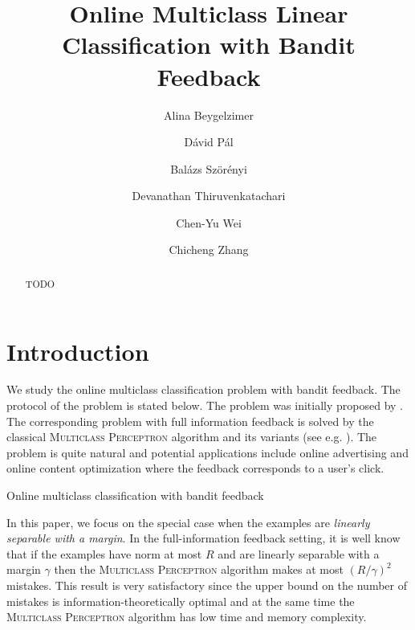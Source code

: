 \documentclass[12pt]{article}
\title{Online Multiclass Linear Classification with Bandit Feedback}
\author{
Alina Beygelzimer \and
D\'avid P\'al \and
Bal\'azs Sz\"or\'enyi \and
Devanathan Thiruvenkatachari \and
Chen-Yu Wei \and
Chicheng Zhang
}
\begin{document}
\maketitle

\begin{abstract}
TODO
\end{abstract}

\section{Introduction}
\label{section:introduction}

We study the online multiclass classification problem with bandit feedback. The
protocol of the problem is stated below. The problem was initially proposed by
\cite{Kakade-Shalev-Shwartz-Tewari-2008}. The corresponding problem with full
information feedback is solved by the classical \textsc{Multiclass Perceptron}
algorithm and its variants (see e.g.
\cite{Crammer-Dekel-Keshet-Shalev-Shwartz-Singer-2006}). The problem is quite
natural and potential applications include online advertising and online content
optimization where the feedback corresponds to a user's click.

\begin{algorithm}[h]
\caption{Online multiclass classification with bandit feedback
\label{algorithm:game-protocol}}
\begin{algorithmic}[1]
{
\ENDFOR
}
\end{algorithmic}
\end{algorithm}

In this paper, we focus on the special case when the examples are \emph{linearly
separable with a margin}. In the full-information feedback setting, it is well
know that if the examples have norm at most $R$ and are linearly separable with
a margin $\gamma$ then the \textsc{Multiclass Perceptron} algorithm makes at
most $(R/\gamma)^2$ mistakes. This result is very satisfactory since the upper
bound on the number of mistakes is information-theoretically optimal and at the
same time the \textsc{Multiclass Perceptron} algorithm has low time and memory
complexity.
\end{document}
